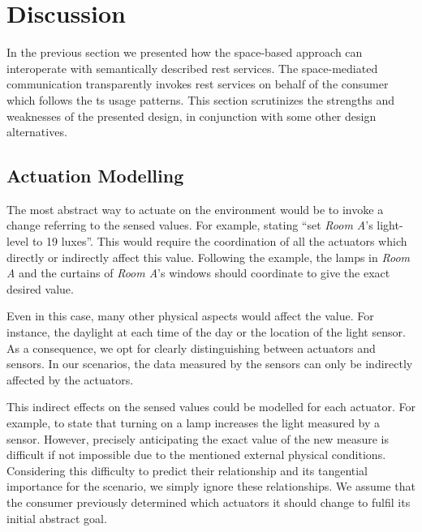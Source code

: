 \section{Discussion}
\label{sec:actuation_discussion}


In the previous section we presented how the space-based approach can interoperate with semantically described \ac{rest} services.
The space-mediated communication transparently invokes \ac{rest} services on behalf of the consumer which follows the \ac{ts} usage patterns.
This section scrutinizes the strengths and weaknesses of the presented design, in conjunction with some other design alternatives. %




\subsection{Actuation Modelling}

The most abstract way to actuate on the environment would be to invoke a change referring to the sensed values.
For example, stating ``set \emph{Room A}'s light-level to 19 luxes''.
This would require the coordination of all the actuators which directly or indirectly affect this value.
Following the example, the lamps in \emph{Room A} and the curtains of \emph{Room A}'s windows should coordinate to give the exact desired value.


Even in this case, many other physical aspects would affect the value.
For instance, the daylight at each time of the day or the location of the light sensor.
As a consequence, we opt for clearly distinguishing between actuators and sensors.
In our scenarios, the data measured by the sensors can only be indirectly affected by the actuators.


This indirect effects on the sensed values could be modelled for each actuator.
For example, to state that turning on a lamp increases the light measured by a sensor.
However, precisely anticipating the exact value of the new measure is difficult if not impossible due to the mentioned external physical conditions.
Considering this difficulty to predict their relationship and its tangential importance for the scenario, we simply ignore these relationships.
We assume that the consumer previously determined which actuators it should change to fulfil its initial abstract goal.


